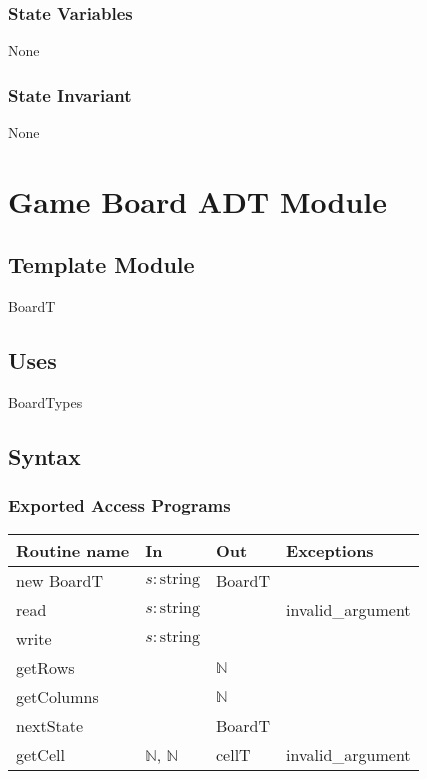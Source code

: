 \documentclass[12pt]{article}
\begin{document}
\subsubsection* {State Variables}

None

\subsubsection* {State Invariant}

None

\newpage

\section* {Game Board ADT Module}

\subsection*{Template Module}

BoardT

\subsection* {Uses}

\noindent BoardTypes

\subsection* {Syntax}



\subsubsection* {Exported Access Programs}

\begin{tabular}{| l | l | l | l |}
\hline
\textbf{Routine name} & \textbf{In} & \textbf{Out} & \textbf{Exceptions}\\
\hline
new BoardT  & $s: \mbox{string}$ & BoardT & \\
\hline
read & $s: \mbox{string}$ & & invalid\_argument\\
\hline
write & $s: \mbox{string}$ & & \\
\hline
getRows &  & $\mathbb{N}$ &\\
\hline
getColumns &  & $\mathbb{N}$ & \\
\hline
nextState &  & BoardT &\\
\hline
getCell& $\mathbb{N}$, $\mathbb{N}$ & cellT &invalid\_argument \\
\hline

\end{tabular}
\end{document}
